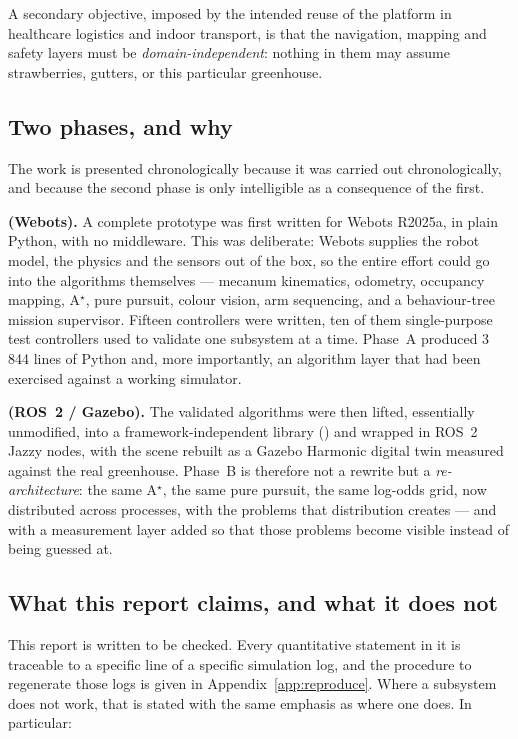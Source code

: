 A secondary objective, imposed by the intended reuse of the platform in
healthcare logistics and indoor transport, is that the navigation,
mapping and safety layers must be \emph{domain-independent}: nothing in
them may assume strawberries, gutters, or this particular greenhouse.

\subsection{Two phases, and why}

The work is presented chronologically because it was carried out
chronologically, and because the second phase is only intelligible as a
consequence of the first.

\textbf{\phaseA{} (Webots).} A complete prototype was first written for
Webots R2025a, in plain Python, with no middleware. This was deliberate:
Webots supplies the robot model, the physics and the sensors out of the
box, so the entire effort could go into the algorithms themselves ---
mecanum kinematics, odometry, occupancy mapping, A$^\star$, pure
pursuit, colour vision, arm sequencing, and a behaviour-tree mission
supervisor. Fifteen controllers were written, ten of them single-purpose
test controllers used to validate one subsystem at a time. Phase~A
produced 3\,844 lines of Python and, more importantly, an algorithm
layer that had been exercised against a working simulator.

\textbf{\phaseB{} (ROS~2 / Gazebo).} The validated algorithms were then
lifted, essentially unmodified, into a framework-independent library
() and wrapped in ROS~2 Jazzy nodes, with
the scene rebuilt as a Gazebo Harmonic digital twin measured against the
real greenhouse. Phase~B is therefore not a rewrite but a
\emph{re-architecture}: the same A$^\star$, the same pure pursuit, the
same log-odds grid, now distributed across processes, with the problems
that distribution creates --- and with a measurement layer added so that
those problems become visible instead of being guessed at.

\subsection{What this report claims, and what it does not}

This report is written to be checked. Every quantitative statement in it
is traceable to a specific line of a specific simulation log, and the
procedure to regenerate those logs is given in Appendix~\ref{app:reproduce}.
Where a subsystem does not work, that is stated with the same emphasis
as where one does. In particular:

